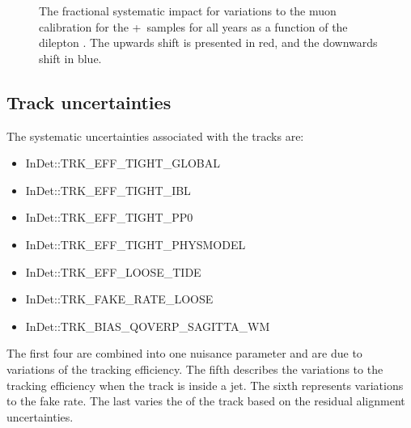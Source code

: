 \begin{figure}[h!]
  \caption{The fractional systematic impact for variations to the muon calibration for the \powheg+\pythia~samples for all years as a function of the dilepton \pt. The upwards shift is presented in red, and the downwards shift in blue.}
  \label{fig:PP8MuCalSyst}
\end{figure}

\subsection{Track uncertainties}

The systematic uncertainties associated with the tracks are:

\begin{itemize}
  \item InDet::TRK\_EFF\_TIGHT\_GLOBAL
  \item InDet::TRK\_EFF\_TIGHT\_IBL
  \item InDet::TRK\_EFF\_TIGHT\_PP0
  \item InDet::TRK\_EFF\_TIGHT\_PHYSMODEL
  \item InDet::TRK\_EFF\_LOOSE\_TIDE
  \item InDet::TRK\_FAKE\_RATE\_LOOSE
  \item InDet::TRK\_BIAS\_QOVERP\_SAGITTA\_WM
\end{itemize}

The first four are combined into one nuisance parameter and are due to variations of the tracking efficiency. The fifth describes the variations to the tracking efficiency when the track is inside a jet.
The sixth represents variations to the fake rate. The last varies the \pt of the track based on the residual alignment uncertainties.

